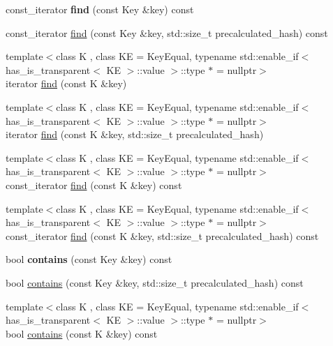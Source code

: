 \begin{DoxyCompactItemize}
const\+\_\+iterator {\bfseries find} (const Key \&key) const
\item 
const\+\_\+iterator \mbox{\hyperlink{classtsl_1_1robin__set_a76283e2c9497ee7d4e5eddfdb23d23bb}{find}} (const Key \&key, std\+::size\+\_\+t precalculated\+\_\+hash) const
\item 
{\footnotesize template$<$class K , class KE  = Key\+Equal, typename std\+::enable\+\_\+if$<$ has\+\_\+is\+\_\+transparent$<$ K\+E $>$\+::value $>$\+::type $\ast$  = nullptr$>$ }\\iterator \mbox{\hyperlink{classtsl_1_1robin__set_ab715840532a8616bed9a39f9d92b3b17}{find}} (const K \&key)
\item 
{\footnotesize template$<$class K , class KE  = Key\+Equal, typename std\+::enable\+\_\+if$<$ has\+\_\+is\+\_\+transparent$<$ K\+E $>$\+::value $>$\+::type $\ast$  = nullptr$>$ }\\iterator \mbox{\hyperlink{classtsl_1_1robin__set_a6252e181b2bb806733a5e45b90f67d35}{find}} (const K \&key, std\+::size\+\_\+t precalculated\+\_\+hash)
\item 
{\footnotesize template$<$class K , class KE  = Key\+Equal, typename std\+::enable\+\_\+if$<$ has\+\_\+is\+\_\+transparent$<$ K\+E $>$\+::value $>$\+::type $\ast$  = nullptr$>$ }\\const\+\_\+iterator \mbox{\hyperlink{classtsl_1_1robin__set_a19a90ecba2c0ff2505960501375931ea}{find}} (const K \&key) const
\item 
{\footnotesize template$<$class K , class KE  = Key\+Equal, typename std\+::enable\+\_\+if$<$ has\+\_\+is\+\_\+transparent$<$ K\+E $>$\+::value $>$\+::type $\ast$  = nullptr$>$ }\\const\+\_\+iterator \mbox{\hyperlink{classtsl_1_1robin__set_a22f4c432414bf50d914f382e4965a018}{find}} (const K \&key, std\+::size\+\_\+t precalculated\+\_\+hash) const
\item 
\mbox{\label{classtsl_1_1robin__set_ae9ce9304b7ebbb92b2b8ae961f3d89bf}} 
bool {\bfseries contains} (const Key \&key) const
\item 
bool \mbox{\hyperlink{classtsl_1_1robin__set_adbd4d95859060848234156f4d649acd8}{contains}} (const Key \&key, std\+::size\+\_\+t precalculated\+\_\+hash) const
\item 
{\footnotesize template$<$class K , class KE  = Key\+Equal, typename std\+::enable\+\_\+if$<$ has\+\_\+is\+\_\+transparent$<$ K\+E $>$\+::value $>$\+::type $\ast$  = nullptr$>$ }\\bool \mbox{\hyperlink{classtsl_1_1robin__set_aa71372dea154b9ab713a27aa52552439}{contains}} (const K \&key) const

\end{DoxyCompactItemize}
